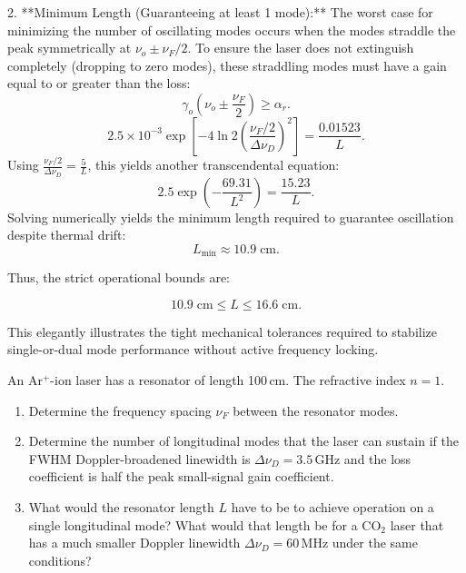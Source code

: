 2. **Minimum Length (Guaranteeing at least 1 mode):** The worst case for minimizing the number of oscillating modes occurs when the modes straddle the peak symmetrically at $\nu_o \pm \nu_F/2$. To ensure the laser does not extinguish completely (dropping to zero modes), these straddling modes must have a gain equal to or greater than the loss:
\begin{equation*}
  \gamma_o\left(\nu_o \pm \frac{\nu_F}{2}\right) \ge \alpha_r.
\end{equation*}
\begin{equation*}
  2.5\times10^{-3} \exp\left[ -4\ln 2 \left( \frac{\nu_F/2}{\Delta\nu_D} \right)^2 \right] = \frac{0.01523}{L}.
\end{equation*}
Using $\frac{\nu_F/2}{\Delta\nu_D} = \frac{5}{L}$, this yields another transcendental equation:
\begin{equation*}
  2.5 \exp\left( -\frac{69.31}{L^2} \right) = \frac{15.23}{L}.
\end{equation*}
Solving numerically yields the minimum length required to guarantee oscillation despite thermal drift:
\begin{equation*}
  L_{\min} \approx 10.9\;\text{cm}.
\end{equation*}

Thus, the strict operational bounds are:

\begin{equation*}
  \boxed{10.9\;\text{cm} \le L \le 16.6\;\text{cm}.}
\end{equation*}

This elegantly illustrates the tight mechanical tolerances required to stabilize single-or-dual mode performance without active frequency locking.


\begin{question}[Question 8]An Ar$^{+}$-ion laser has a resonator of length 100\,cm. The refractive
index $n=1$.
\begin{enumerate}[label=(\alph*)]
  \item Determine the frequency spacing $\nu_{F}$ between the resonator modes.
  \item Determine the number of longitudinal modes that the laser can sustain if the FWHM
        Doppler-broadened linewidth is $\Delta\nu_{D}=3.5$\,GHz and the loss coefficient is
        half the peak small-signal gain coefficient.
  \item What would the resonator length $L$ have to be to achieve operation on a single
        longitudinal mode? What would that length be for a CO$_{2}$ laser that has a much
        smaller Doppler linewidth $\Delta\nu_{D}=60$\,MHz under the same conditions?
\end{enumerate}
\end{question}

